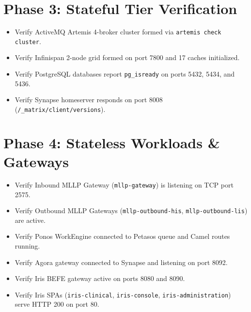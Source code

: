 \section{Phase 3: Stateful Tier Verification}
\begin{itemize}[label=$\square$]
    \item Verify ActiveMQ Artemis 4-broker cluster formed via \nolinkurl{artemis check cluster}.
    \item Verify Infinispan 2-node grid formed on port 7800 and 17 caches initialized.
    \item Verify PostgreSQL databases report \nolinkurl{pg_isready} on ports 5432, 5434, and 5436.
    \item Verify Synapse homeserver responds on port 8008 (\nolinkurl{/_matrix/client/versions}).
\end{itemize}

\section{Phase 4: Stateless Workloads \& Gateways}
\begin{itemize}[label=$\square$]
    \item Verify Inbound MLLP Gateway (\nolinkurl{mllp-gateway}) is listening on TCP port 2575.
    \item Verify Outbound MLLP Gateways (\nolinkurl{mllp-outbound-his}, \nolinkurl{mllp-outbound-lis}) are active.
    \item Verify Ponos WorkEngine connected to Petasos queue and Camel routes running.
    \item Verify Agora gateway connected to Synapse and listening on port 8092.
    \item Verify Iris BEFE gateway active on ports 8080 and 8090.
    \item Verify Iris SPAs (\nolinkurl{iris-clinical}, \nolinkurl{iris-console}, \nolinkurl{iris-administration}) serve HTTP 200 on port 80.
\end{itemize}

\newpage
